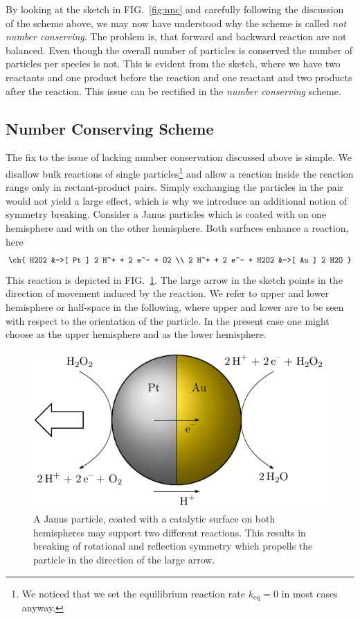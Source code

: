 \documentclass[aip,jcp,reprint,a4paper,onecolumn,nofootinbib,amsmath,amssymb]{revtex4-1}
\begin{document}
By looking at the sketch in FIG.~\ref{fig:nnc} and carefully following
the discussion of the scheme above, we may now have understood why the
scheme is called \emph{not number conserving}.  The problem is, that
forward and backward reaction are not balanced.  Even though the
overall number of particles is conserved the number of particles per
species is not.  This is evident from the sketch, where we have two
reactants and one product before the reaction and one reactant and two
products after the reaction.  This issue can be rectified in the
\emph{number conserving} scheme.

\subsection{Number Conserving Scheme}

The fix to the issue of lacking number conservation discussed above is
simple.  We disallow bulk reactions of single particles\footnote{We
  noticed that we set the equilibrium reaction rate $k_{\text{eq}} =
  0$ in most cases anyway.} and allow a reaction inside the reaction
range only in rectant-product pairs.  Simply exchanging the particles
in the pair would not yield a large effect, which is why we introduce
an additional notion of symmetry breaking.  Consider a Janus particles
which is coated with  on one hemisphere and with  on the
other hemisphere.  Both surfaces enhance a reaction,
here\cite{Gibbs_10,Wheat_10}
\begin{align}
  \label{eq:H2O2}
  \ch{
    H2O2 &->[ Pt ] 2 H^+ + 2 e^- + O2 \\
    2 H^+ + 2 e^- + H2O2 &->[ Au ] 2 H2O
  }
\end{align}
This reaction is depicted in FIG.~\ref{fig:janus}.  The large arrow in
the sketch points in the direction of movement induced by the
reaction.  We refer to upper and lower hemisphere or half-space in the
following, where upper and lower are to be seen with respect to the
orientation of the particle.  In the present case one might choose
 as the upper hemisphere and  as the lower hemisphere.

\begin{figure}
  \centering
  \includegraphics{FIGURES/janus-particle}
  \caption{A Janus particle, coated with a catalytic surface on both
    hemispheres may support two different reactions.  This results in
    breaking of rotational and reflection symmetry which propells the
    particle in the direction of the large arrow.}
  \label{fig:janus}
\end{figure}
\end{document}
